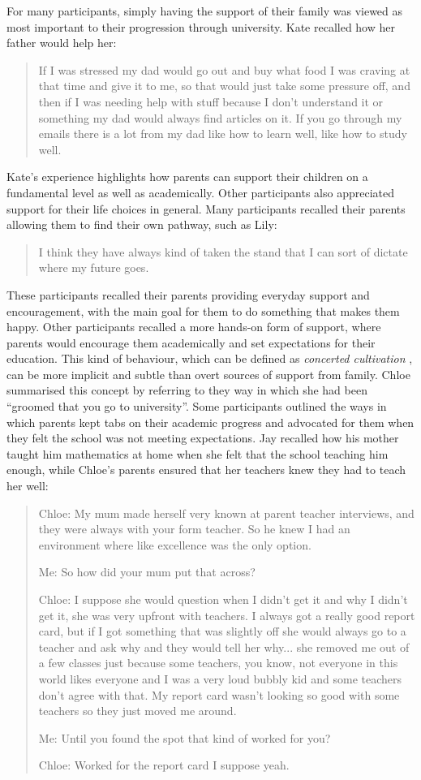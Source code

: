 For many participants, simply having the support of their family was viewed as most important to their progression through university. Kate recalled how her father would help her: \blockquote{If I was stressed my dad would go out and buy what food I was craving at that time and give it to me, so that would just take some pressure off, and then if I was needing help with stuff because I don’t understand it or something my dad would always find articles on it. If you go through my emails there is a lot from my dad like how to learn well, like how to study well.} Kate's experience highlights how parents can support their children on a fundamental level as well as academically. Other participants also appreciated support for their life choices in general. Many participants recalled their parents allowing them to find their own pathway, such as Lily: \blockquote{I think they have always kind of taken the stand that I can sort of dictate where my future goes.} These participants recalled their parents providing everyday support and encouragement, with the main goal for them to do something that makes them happy. Other participants recalled a more hands-on form of support, where parents would encourage them academically and set expectations for their education. This kind of behaviour, which can be defined as \textit{concerted cultivation} \citep{lareau2011unequal}, can be more implicit and subtle than overt sources of support from family. Chloe summarised this concept by referring to they way in which she had been ``groomed that you go to university''. Some participants outlined the ways in which parents kept tabs on their academic progress and advocated for them when they felt the school was not meeting expectations. Jay recalled how his mother taught him mathematics at home when she felt that the school teaching him enough, while Chloe's parents ensured that her teachers knew they had to teach her well: \blockquote{
Chloe: My mum made herself very known at parent teacher interviews, and they were always with your form teacher. So he knew I had an environment where like excellence was the only option.

Me: So how did your mum put that across?

Chloe: I suppose she would question when I didn't get it and why I didn't get it, she was very upfront with teachers. I always got a really good report card, but if I got something that was slightly off she would always go to a teacher and ask why and they would tell her why... she removed me out of a few classes just because some teachers, you know, not everyone in this world likes everyone and I was a very loud bubbly kid and some teachers don’t agree with that. My report card wasn't looking so good with some teachers so they just moved me around.

Me:	Until you found the spot that kind of worked for you?

Chloe:	Worked for the report card I suppose yeah.
}
